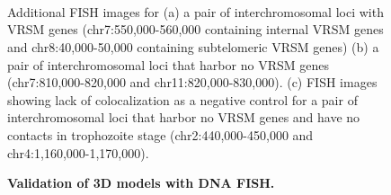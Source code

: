 \documentclass{article}
\begin{document}
\begin{figure}
  \begin{center}
   \\
   \\
  \hspace{0.015\textwidth}
  \\
  \end{center}
\caption{{\bf Validation of 3D models with DNA FISH.}}
{ Additional FISH images for (a) a pair of interchromosomal loci with VRSM
  genes (chr7:550,000-560,000 containing internal VRSM genes and
  chr8:40,000-50,000 containing subtelomeric VRSM genes)
  (b) a pair of interchromosomal loci that harbor no VRSM genes
  (chr7:810,000-820,000 and chr11:820,000-830,000).
  (c) FISH images showing lack of colocalization as a negative
  control for a pair of interchromosomal loci that harbor no VRSM genes
  and have no contacts in trophozoite stage (chr2:440,000-450,000 and chr4:1,160,000-1,170,000).
}
\label{suppfig:fish}
\end{figure}
\clearpage
\end{document}
